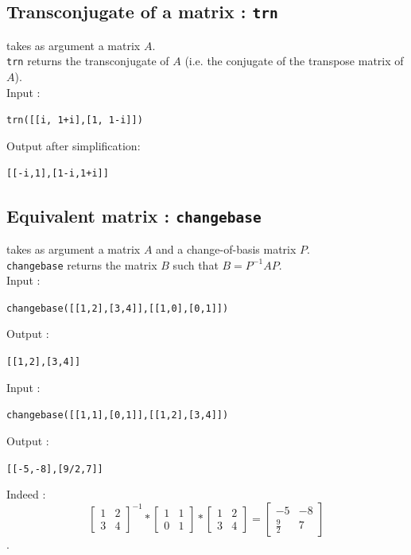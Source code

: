\documentclass[a4paper,11pt]{book}
\begin{document}
\subsection{Transconjugate of a matrix : {\tt trn}}
 takes as argument a matrix $A$.\\
{\tt trn} returns the transconjugate of $A$ (i.e. the conjugate of the 
transpose matrix of $A$).\\
Input :
\begin{center}{\tt trn([[i, 1+i],[1, 1-i]])}\end{center}
Output after simplification:
\begin{center}{\tt [[-i,1],[1-i,1+i]]}\end{center}


\subsection{Equivalent matrix : {\tt changebase}}
 takes as argument a matrix $A$ and a
change-of-basis matrix $P$.\\
{\tt changebase} returns the matrix $B$ such that $B=P^{-1}AP$.\\
Input :
\begin{center}{\tt changebase([[1,2],[3,4]],[[1,0],[0,1]])}\end{center}
Output :
\begin{center}{\tt [[1,2],[3,4]]}\end{center}
Input :
\begin{center}{\tt changebase([[1,1],[0,1]],[[1,2],[3,4]])}\end{center}
Output :
\begin{center}{\tt [[-5,-8],[9/2,7]]}\end{center}
Indeed :
 $${\left[\begin{array}{rr} 1 & 2\\3&4\end{array}\right]}^{-1}*\left[\begin{array}{rr}1 & 1\\0&1\end{array}\right]*\left[\begin{array}{rr}1 & 2\\3&4\end{array}\right]=\left[\begin{array}{rr}-5 & -8\\\frac{9}{2}&7\end{array}\right]$$.
\end{document}
